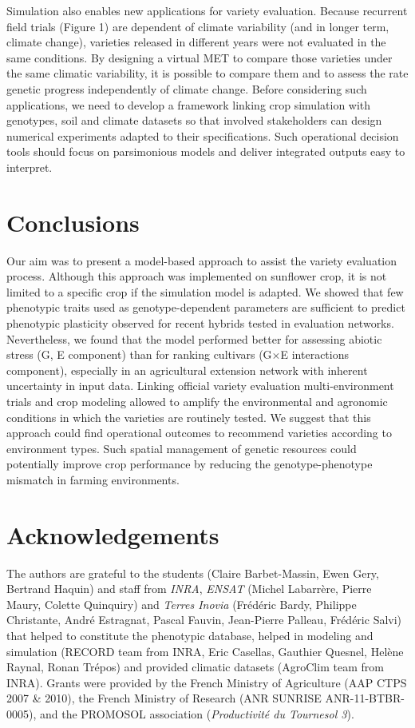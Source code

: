 \documentclass[a4paper]{article}
\begin{document}
Simulation also enables new applications for variety evaluation. Because
recurrent field trials (Figure 1) are dependent of climate variability
(and in longer term, climate change), varieties released in different
years were not evaluated in the same conditions. By designing a virtual
MET to compare those varieties under the same climatic variability, it
is possible to compare them and to assess the rate genetic progress
independently of climate change. Before considering such applications,
we need to develop a framework linking crop simulation with genotypes,
soil and climate datasets so that involved stakeholders can design
numerical experiments adapted to their specifications. Such operational
decision tools should focus on parsimonious models and deliver
integrated outputs easy to interpret.

\section{Conclusions}\label{conclusions}

Our aim was to present a model-based approach to assist the variety
evaluation process. Although this approach was implemented on sunflower
crop, it is not limited to a specific crop if the simulation model is
adapted. We showed that few phenotypic traits used as genotype-dependent
parameters are sufficient to predict phenotypic plasticity observed for
recent hybrids tested in evaluation networks. Nevertheless, we found
that the model performed better for assessing abiotic stress (G, E
component) than for ranking cultivars (G\(\times\)E interactions
component), especially in an agricultural extension network with
inherent uncertainty in input data. Linking official variety evaluation
multi-environment trials and crop modeling allowed to amplify the
environmental and agronomic conditions in which the varieties are
routinely tested. We suggest that this approach could find operational
outcomes to recommend varieties according to environment types. Such
spatial management of genetic resources could potentially improve crop
performance by reducing the genotype-phenotype mismatch in farming
environments.

\section{Acknowledgements}\label{acknowledgements}

The authors are grateful to the students (Claire Barbet-Massin, Ewen
Gery, Bertrand Haquin) and staff from \emph{INRA}, \emph{ENSAT} (Michel
Labarrère, Pierre Maury, Colette Quinquiry) and \emph{Terres Inovia}
(Frédéric Bardy, Philippe Christante, André Estragnat, Pascal Fauvin,
Jean-Pierre Palleau, Frédéric Salvi) that helped to constitute the
phenotypic database, helped in modeling and simulation (RECORD team from
INRA, Eric Casellas, Gauthier Quesnel, Helène Raynal, Ronan Trépos) and
provided climatic datasets (AgroClim team from INRA). Grants were
provided by the French Ministry of Agriculture (AAP CTPS 2007 \& 2010),
the French Ministry of Research (ANR SUNRISE ANR-11-BTBR-0005), and the
PROMOSOL association (\emph{Productivité du Tournesol 3}).
\end{document}
